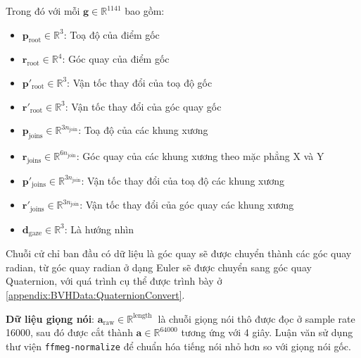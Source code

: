Trong  đó với mỗi $\mathbf{g} \in \mathbb{R}^{1141}$ bao gồm:
{
	\begin{itemize}
		\item $\mathbf{p}_{\text{root}} \in \mathbb{R}^3$: Toạ độ của điểm gốc
		\item $\mathbf{r}_{\text{root}} \in \mathbb{R}^4$: Góc quay của điểm gốc
		\item $\mathbf{p}'_{\text{root}} \in \mathbb{R}^3$: Vận tốc thay đổi của toạ độ gốc
		\item $\mathbf{r}'_{\text{root}} \in \mathbb{R}^3$: Vận tốc thay đổi của góc quay gốc
		
		\item $\mathbf{p}_{\text{joins}} \in \mathbb{R}^{3 n_{\text{join} }}$: Toạ độ của các khung xương
		\item $\mathbf{r}_{\text{joins}} \in \mathbb{R}^{6 n_{\text{join} }}$: Góc quay của các khung xương theo mặc phẳng X và Y
		\item $\mathbf{p}'_{\text{joins}} \in \mathbb{R}^{3n_{\text{join} }}$: Vận tốc thay đổi của toạ độ các khung xương
		\item $\mathbf{r}'_{\text{joins}} \in \mathbb{R}^{3n_{\text{join} }}$: Vận tốc thay đổi của góc quay các khung xương
		\item $\mathbf{d}_{\text{gaze}} \in \mathbb{R}^3$: Là hướng nhìn
\end{itemize}}




Chuỗi cử chỉ ban đầu có dữ liệu là góc quay sẽ được chuyển thành các góc quay radian, từ góc quay radian ở dạng Euler sẽ được chuyển sang góc quay Quaternion, với quá trình cụ thể được trình bày ở \autoref{appendix:BVHData:QuaternionConvert}.

\textbf{Dữ liệu giọng nói}: $\mathbf{a}_{\text{raw}} \in \mathbb{R}^{ \text{length } }$ là chuỗi giọng nói thô được đọc ở sample rate 16000, sau đó được cắt thành $\mathbf{a} \in \mathbb{R}^{64000}$ tương ứng với 4 giây. Luận văn sử dụng thư viện \texttt{ffmeg-normalize} để chuẩn hóa tiếng nói nhỏ hơn so với giọng nói gốc.

